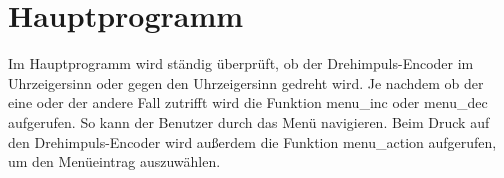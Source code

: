 \section{Hauptprogramm}
Im Hauptprogramm wird ständig überprüft, ob der Drehimpuls-Encoder im Uhrzeigersinn oder gegen den Uhrzeigersinn gedreht wird. Je nachdem ob der eine oder der andere Fall zutrifft wird die Funktion menu\_inc oder menu\_dec aufgerufen. So kann der Benutzer durch das Menü navigieren. Beim Druck auf den Drehimpuls-Encoder wird außerdem die Funktion menu\_action aufgerufen, um den Menüeintrag auszuwählen.